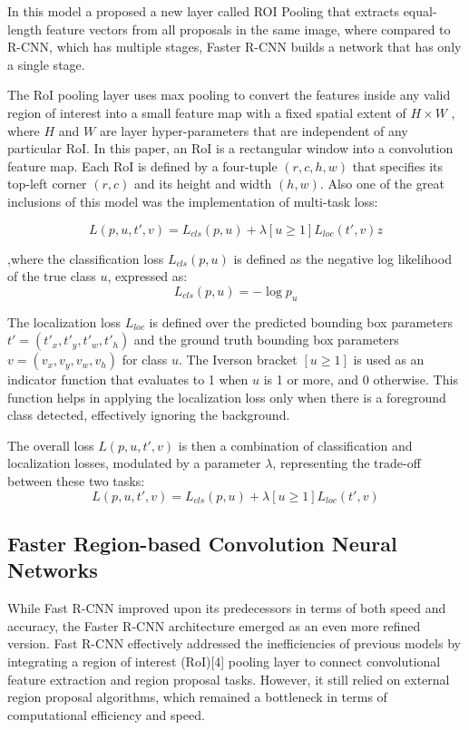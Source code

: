 In this model a proposed a new layer called ROI Pooling that extracts equal-length feature vectors from all proposals in the same image, where 
compared to R-CNN, which has multiple stages, Faster R-CNN builds a network that has only a single stage. 

The RoI pooling layer uses max pooling to convert the features inside any valid region of interest into a small feature map with a fixed spatial 
extent of \(H × W\) , where $H$ and $W$ are layer hyper-parameters that are independent of any particular RoI. In this paper, an RoI is a rectangular window 
into a convolution feature map. Each RoI is defined by a four-tuple \((r, c, h, w)\) that specifies its top-left corner \((r, c)\) and its height 
and width \((h, w)\). Also one of the great inclusions of this model was the implementation of multi-task loss:

\[L(p, u, t', v) = L_{cls}(p, u) + \lambda [u \geq 1] L_{loc}(t', v)z\]

,where the classification loss \(L_{cls}(p, u)\) is defined as the negative log likelihood of the true class \(u\), expressed as:
\[
L_{cls}(p, u) = -\log p_u
\]

The localization loss \(L_{loc}\) is defined over the predicted bounding box parameters \(t' = (t'_x, t'_y, t'_w, t'_h)\) and the ground truth bounding 
box parameters \(v = (v_x, v_y, v_w, v_h)\) for class \(u\). The Iverson bracket \([u \geq 1]\) is used as an indicator function that evaluates to 1 
when \(u\) is 1 or more, and 0 otherwise. This function helps in applying the localization loss only when there is a foreground class detected, 
effectively ignoring the background.

The overall loss \(L(p, u, t', v)\) is then a combination of classification and localization losses, modulated by a parameter \(\lambda\), representing the trade-off between these two tasks:
\[
L(p, u, t', v) = L_{cls}(p, u) + \lambda [u \geq 1] L_{loc}(t', v)
\]


\subsection{Faster Region-based Convolution Neural Networks}

While Fast R-CNN improved upon its predecessors in terms of both speed and accuracy, the Faster R-CNN architecture emerged as an even more refined version. 
Fast R-CNN effectively addressed the inefficiencies of previous models by integrating a region of interest (RoI)[4] pooling layer to connect convolutional 
feature extraction and region proposal tasks. However, it still relied on external region proposal algorithms, which remained a bottleneck in terms of 
computational efficiency and speed. 

